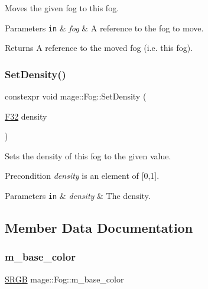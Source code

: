 Moves the given fog to this fog.


\begin{DoxyParams}[1]{Parameters}
\mbox{\tt in}  & {\em fog} & A reference to the fog to move. \\
\hline
\end{DoxyParams}
\begin{DoxyReturn}{Returns}
A reference to the moved fog (i.\+e. this fog). 
\end{DoxyReturn}
\hypertarget{classmage_1_1_fog_a51ecd07e2e1ac7ae14ec8855f16aed53}{}\label{classmage_1_1_fog_a51ecd07e2e1ac7ae14ec8855f16aed53} 
\subsubsection{\texorpdfstring{Set\+Density()}{SetDensity()}}
{\footnotesize\ttfamily constexpr void mage\+::\+Fog\+::\+Set\+Density (\begin{DoxyParamCaption}\item[{\hyperlink{namespacemage_aa97e833b45f06d60a0a9c4fc22ae02c0}{F32}}]{density }\end{DoxyParamCaption})\hspace{0.3cm}{\ttfamily [noexcept]}}

Sets the density of this fog to the given value.

\begin{DoxyPrecond}{Precondition}
{\itshape density} is an element of \mbox{[}0,1\mbox{]}. 
\end{DoxyPrecond}

\begin{DoxyParams}[1]{Parameters}
\mbox{\tt in}  & {\em density} & The density. \\
\hline
\end{DoxyParams}


\subsection{Member Data Documentation}
\hypertarget{classmage_1_1_fog_a8b7ddd68efcb241c10b4e82228b914ee}{}\label{classmage_1_1_fog_a8b7ddd68efcb241c10b4e82228b914ee} 
\subsubsection{\texorpdfstring{m\+\_\+base\+\_\+color}{m\_base\_color}}
{\footnotesize\ttfamily \hyperlink{structmage_1_1_s_r_g_b}{S\+R\+GB} mage\+::\+Fog\+::m\+\_\+base\+\_\+color\hspace{0.3cm}{\ttfamily [private]}}


